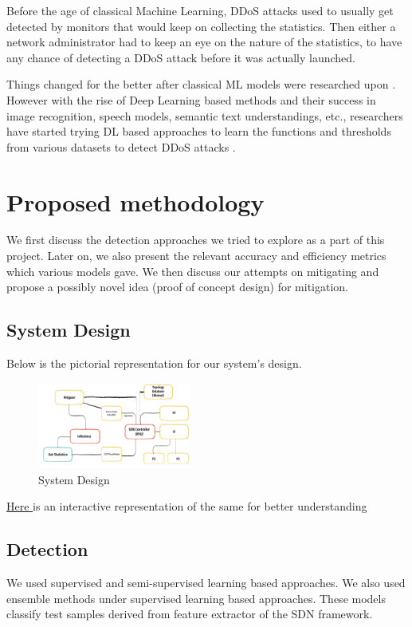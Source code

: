 \documentclass[10pt,twocolumn,letterpaper]{article}
\begin{document}
Before the age of classical Machine Learning, DDoS attacks used to usually get detected by monitors that would keep on collecting the statistics. Then either a network administrator had to keep an eye on the nature of the statistics, to have any chance of detecting a DDoS attack before it was actually launched.

Things changed for the better after classical ML models were researched upon \cite{ml_survey}. However with the rise of Deep Learning based methods and their success in image recognition, speech models, semantic text understandings, etc., researchers have started trying DL based approaches to learn the functions and thresholds from various datasets to detect DDoS attacks \cite{ddos1} \cite{ddos2}.

\section{Proposed methodology}
We first discuss the detection approaches we tried to explore as a part of this project. Later on, we also present the relevant accuracy and efficiency metrics which various models gave.
We then discuss our attempts on mitigating and propose a possibly novel idea (proof of concept design) for mitigation. 
\subsection{System Design}
Below is the pictorial representation for our system's design.
\begin{figure}[h]
    \includegraphics[width = 0.45\textwidth]{src/img/system_design.png}
    \caption{System Design}
    \label{fig:incep}
\end{figure}
\href{https://public.flourish.studio/visualisation/9782692/}{Here }is an interactive representation of the same for better understanding


\subsection{Detection}

We used supervised and semi-supervised learning based approaches. We also used ensemble methods under supervised learning based approaches. These models classify test samples derived from feature extractor of the SDN framework.
\end{document}
